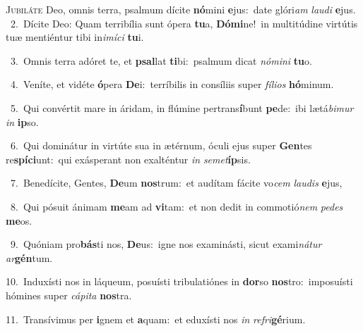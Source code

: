 \lettrine{\initial\textcolor{\initialcolor}{J}}{ubiláte} Deo, omnis terra, psalmum dícite \textbf{nó}\-mini \textbf{e}\-jus:~\star date glóri\textit{am} \textit{lau}\-\textit{di} \textbf{e}\-jus.\\
{\numbfont\textcolor{\numbcolor}{~2.}}~Dícite Deo: Quam terribília sunt ópera \textbf{tu}\-a, \textbf{Dó}\-\textbf{mi}ne!~\star in multitúdine virtútis tuæ mentiéntur tibi in\-\textit{i}\-\textit{mí}\textit{ci} \textbf{tu}\-i.\par
{\numbfont\textcolor{\numbcolor}{~3.}}~Omnis terra adóret te, et \textbf{psal}\-lat \textbf{ti}\-bi:~\star psalmum dicat \textit{nó}\-\textit{mi}\textit{ni} \textbf{tu}\-o.\par
{\numbfont\textcolor{\numbcolor}{~4.}}~Veníte, et vidéte \textbf{ó}\-pera \textbf{De}\-i:~\star terríbilis in consíliis super \textit{fí}\-\textit{li}\textit{os} \textbf{hó}\-minum.\par
{\numbfont\textcolor{\numbcolor}{~5.}}~Qui convértit mare in áridam, in flúmine pertrans\-\textbf{í}\-bunt \textbf{pe}\-de:~\star ibi lætá\-\textit{bi}\-\textit{mur} \textit{in} \textbf{ip}\-so.\par
{\numbfont\textcolor{\numbcolor}{~6.}}~Qui dominátur in virtúte sua in ætérnum, óculi ejus super \textbf{Gen}\-tes re\-\textbf{spí}\-\textbf{ci}unt:~\star qui exásperant non exalténtur \textit{in} \textit{se}\-\textit{met}\textbf{íp}sis.\par
{\numbfont\textcolor{\numbcolor}{~7.}}~Benedícite, Gentes, \textbf{De}\-um \textbf{nos}\-trum:~\star et audítam fácite vo\textit{cem} \textit{lau}\-\textit{dis} \textbf{e}\-jus,\par
{\numbfont\textcolor{\numbcolor}{~8.}}~Qui pósuit ánimam \textbf{me}\-am ad \textbf{vi}\-tam:~\star et non dedit in commotió\textit{nem} \textit{pe}\-\textit{des} \textbf{me}\-os.\par
{\numbfont\textcolor{\numbcolor}{~9.}}~Quóniam pro\-\textbf{bás}\-ti nos, \textbf{De}\-us:~\star igne nos examinásti, sicut exami\-\textit{ná}\-\textit{tur} \textit{ar}\-\textbf{gén}tum.\par
{\numbfont\textcolor{\numbcolor}{10.}}~Induxísti nos in láqueum, posuísti tribulatiónes in \textbf{dor}\-so \textbf{nos}\-tro:~\star imposuísti hómines super \textit{cá}\-\textit{pi}\textit{ta} \textbf{nos}\-tra.\par
{\numbfont\textcolor{\numbcolor}{11.}}~Transívimus per \textbf{i}\-gnem et \textbf{a}\-quam:~\star et eduxísti nos \textit{in} \textit{re}\-\textit{fri}\textbf{gé}rium.\par

